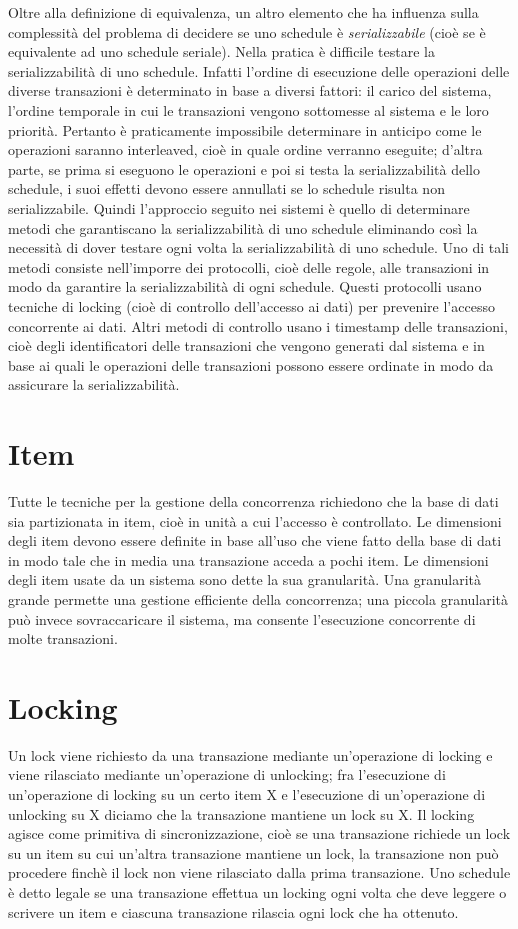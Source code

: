 Oltre alla definizione di equivalenza, un altro elemento che ha influenza sulla complessità del problema di decidere se uno schedule è \textit{serializzabile} (cioè se è equivalente ad uno schedule seriale). Nella pratica è difficile testare la serializzabilità di uno schedule. Infatti l'ordine di esecuzione delle operazioni delle diverse transazioni è determinato in base a diversi fattori: il carico del sistema, l'ordine temporale in cui le transazioni vengono sottomesse al sistema e le loro priorità. Pertanto è praticamente impossibile determinare in anticipo come le operazioni saranno interleaved, cioè in quale ordine verranno eseguite; d'altra parte, se prima si eseguono le operazioni e poi si testa la serializzabilità dello schedule, i suoi effetti devono essere annullati se lo schedule risulta non serializzabile. Quindi l'approccio seguito nei sistemi è quello di determinare metodi che garantiscano la serializzabilità di uno schedule eliminando così la necessità di dover testare ogni volta la serializzabilità di uno schedule. Uno di tali metodi consiste nell'imporre dei protocolli, cioè delle regole, alle transazioni in modo da garantire la serializzabilità di ogni schedule. Questi protocolli usano tecniche di locking (cioè di controllo dell'accesso ai dati) per prevenire l'accesso concorrente ai dati. Altri metodi di controllo usano i timestamp delle transazioni, cioè degli identificatori delle transazioni che vengono generati dal sistema e in base ai quali le operazioni delle transazioni possono essere ordinate in modo da assicurare la serializzabilità.

\section{Item}
Tutte le tecniche per la gestione della concorrenza richiedono che la base di dati sia partizionata in item, cioè in unità a cui l'accesso è controllato. Le dimensioni degli item devono essere definite in base all'uso che viene fatto della base di dati in modo tale che in media una transazione acceda a pochi item. Le dimensioni degli item usate da un sistema sono dette la sua granularità. Una granularità grande permette una gestione efficiente della concorrenza; una piccola granularità può invece sovraccaricare il sistema, ma consente l'esecuzione concorrente di molte transazioni.

\section{Locking}
Un lock viene
richiesto da una transazione mediante un'operazione di locking e viene rilasciato mediante un'operazione di unlocking; fra l'esecuzione di un'operazione di locking su un certo item X e l'esecuzione di un'operazione di unlocking su X diciamo che la transazione mantiene un lock su X. Il locking agisce come primitiva di sincronizzazione, cioè se una transazione richiede un lock su un item su cui un'altra transazione mantiene un lock, la transazione non può procedere finchè il lock non viene rilasciato dalla prima transazione. Uno schedule è detto legale se una transazione effettua un locking ogni volta che deve leggere o scrivere un item e ciascuna transazione rilascia ogni lock che ha ottenuto.

